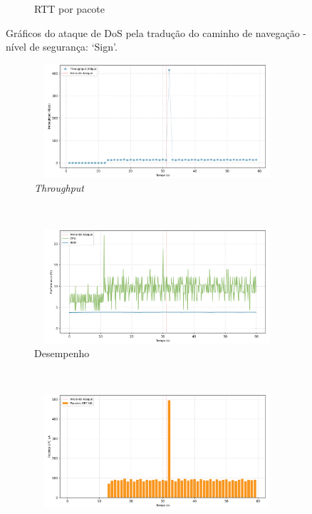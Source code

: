 \begin{apendicesenv}
\begin{figure}[htbp!]
\begin{subfigure}[t]{0.5\textwidth}
        \caption{RTT por pacote}
    \end{subfigure}%
    \label{fig:1-dos_translate_browse_path_call_stack_overflow}
    \caption{Gráficos do ataque de DoS pela tradução do caminho de navegação - nível de segurança: `Sign'.}
\end{figure}

\begin{figure}[htbp!]
    \centering
    \begin{subfigure}[t]{0.5\textwidth}
        \centering
        \includegraphics[width=1\textwidth, height=120pt]{USPSC-img/output/cropped/2-dos_translate_browse_path_call_stack_overflow-tput.png}
        \caption{\textit{Throughput}}
    \end{subfigure}%
    ~ 
    \begin{subfigure}[t]{0.5\textwidth}
        \centering
        \includegraphics[width=1\textwidth, height=120pt]{USPSC-img/output/cropped/2-dos_translate_browse_path_call_stack_overflow-perf.png}
        \caption{Desempenho}
    \end{subfigure}%
    \\
    \begin{subfigure}[t]{0.5\textwidth}
        \centering
        \includegraphics[width=1\textwidth, height=120pt]{USPSC-img/output/cropped/2-dos_translate_browse_path_call_stack_overflow-pack.png}

\end{subfigure}
\end{figure}
\end{apendicesenv}
